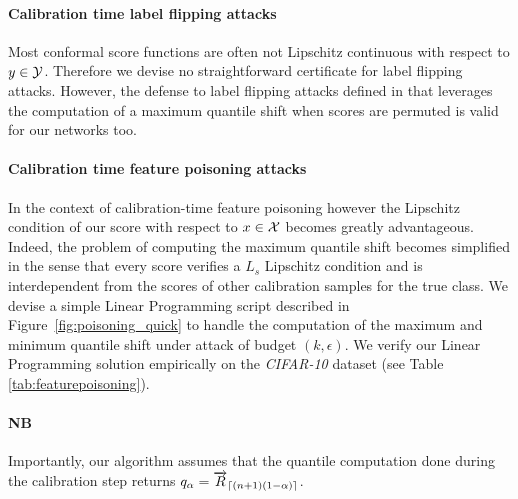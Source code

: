 \label{app:poisoning}

\paragraph{Calibration time label flipping attacks} Most conformal score functions are often not Lipschitz continuous with respect to $y \in \mathcal{Y}$. Therefore we devise no straightforward certificate for label flipping attacks. However, the defense to label flipping attacks defined in \cite{cas} that leverages the computation of a maximum quantile shift when scores are permuted is valid for our networks too.

\paragraph{Calibration time feature poisoning attacks} In the context of calibration-time feature poisoning however the Lipschitz condition of our score with respect to $x \in \mathcal{X}$ becomes greatly advantageous. Indeed, the problem of computing the maximum quantile shift becomes simplified in the sense that every score verifies a $L_s$ Lipschitz condition and is interdependent from the scores of other calibration samples for the true class. We devise a simple Linear Programming script described in Figure~\ref{fig:poisoning_quick} to handle the computation of the maximum and minimum quantile shift under attack of budget $(k,\epsilon)$. We verify our Linear Programming solution empirically on the \emph{CIFAR-10} dataset (see Table \ref{tab:featurepoisoning}). 

\paragraph{NB} Importantly, our algorithm assumes that the quantile computation done during the calibration step returns $q_{\alpha}=\overrightarrow{R}_{\lceil (n+1)(1-\alpha)\rceil}$.



